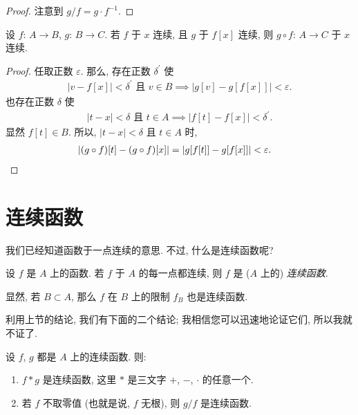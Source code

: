 \begin{proof}
    注意到 $g/f = g \cdot f^{-1}$.
\end{proof}

\begin{theorem}
    设 $f$: $A \to B$, $g$: $B \to C$. 若 $f$ 于 $x$ 连续, 且 $g$ 于 $f[x]$ 连续, 则 $g \circ f$: $A \to C$ 于 $x$ 连续.
\end{theorem}

\begin{proof}
    任取正数 $\varepsilon$. 那么, 存在正数 $\delta^{\prime}$ 使
    \begin{align*}
        \text{$|v - f[x]| < \delta^{\prime}$ 且 $v \in B$} \implies |g[v] - g[f[x]]| < \varepsilon.
    \end{align*}
    也存在正数 $\delta$ 使
    \begin{align*}
        \text{$|t - x| < \delta$ 且 $t \in A$} \implies |f[t] - f[x]| < \delta^{\prime}.
    \end{align*}
    显然 $f[t] \in B$. 所以, $|t - x| < \delta$ 且 $t \in A$ 时,
    \begin{align*}
         & {|(g \circ f)[t] - (g \circ f)[x]| = |g[f[t]] - g[f[x]]| < \varepsilon.} \qedhere
    \end{align*}
\end{proof}

\section{连续函数}

我们已经知道函数于一点连续的意思. 不过, 什么是连续函数呢?

\begin{definition}
    设 $f$ 是 $A$ 上的函数. 若 $f$ 于 $A$ 的每一点都连续, 则 $f$ 是 ($A$ 上的) \emph{连续函数}.
\end{definition}

\begin{remark}
    显然, 若 $B \subset A$, 那么 $f$ 在 $B$ 上的限制 $f_B$ 也是连续函数.
\end{remark}

利用上节的结论, 我们有下面的二个结论; 我相信您可以迅速地论证它们, 所以我就不证了.

\begin{theorem}
    设 $f$, $g$ 都是 $A$ 上的连续函数. 则:
    \begin{enumerate}
        \item $f \ast g$ 是连续函数, 这里 $\ast$ 是三文字 $+$, $-$, $\cdot$ 的任意一个.
        \item 若 $f$ 不取零值 (也就是说, $f$ 无根), 则 $g/f$ 是连续函数.
    \end{enumerate}
\end{theorem}

